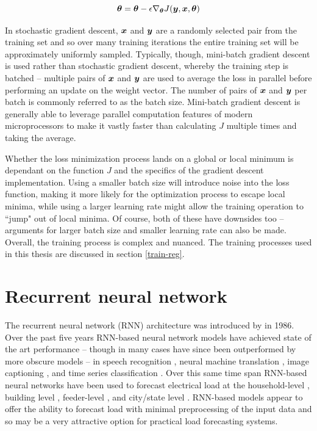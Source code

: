 \begin{equation} \label{gradient_descent}
{\bm{\theta}} = {\bm{\theta}} - \epsilon \nabla_{{\bm{\theta}}}J({\bm{y}}, {\bm{x}}, {\bm{\theta}})
\end{equation}

In stochastic gradient descent, ${\bm{x}}$ and ${\bm{y}}$ are a randomly selected pair from the training set and so over many training iterations the entire training set will be approximately uniformly sampled.
Typically, though, mini-batch gradient descent is used rather than stochastic gradient descent, whereby the training step is batched -- multiple pairs of ${\bm{x}}$ and ${\bm{y}}$ are used to average the loss in parallel before performing an update on the weight vector.
The number of pairs of ${\bm{x}}$ and ${\bm{y}}$ per batch is commonly referred to as the batch size.
Mini-batch gradient descent is generally able to leverage parallel computation features of modern microprocessors to make it vastly faster than calculating $J$ multiple times and taking the average.

Whether the loss minimization process lands on a global or local minimum is dependant on the function $J$ and the specifics of the gradient descent implementation.
Using a smaller batch size will introduce noise into the loss function, making it more likely for the optimization process to escape local minima, while using a larger learning rate might allow the training operation to ``jump" out of local minima.
Of course, both of these have downsides too -- arguments for larger batch size and smaller learning rate can also be made. 
Overall, the training process is complex and nuanced.
The training processes used in this thesis are discussed in section \ref{train-reg}.


\section{Recurrent neural network}
The recurrent neural network (RNN) architecture was introduced by \citet{Rumelhart1986} in 1986.
Over the past five years RNN-based neural network models have achieved state of the art performance -- though in many cases have since been outperformed by more obscure models -- in speech recognition \cite{Chiu2017}, neural machine translation \cite{luong2015effective}, image captioning \cite{yao2017boosting}, and time series classification \cite{Karim2018}.
Over this same time span RNN-based neural networks have been used to forecast electrical load at the household-level \cite{Kong2017}\cite{Shi2018}, building level \cite{Zheng2017a}, feeder-level \cite{Bedi2018}, and city/state level \cite{Narayan2017}\cite{Din2017}.
RNN-based models appear to offer the ability to forecast load with minimal preprocessing of the input data and so may be a very attractive option for practical load forecasting systems.


